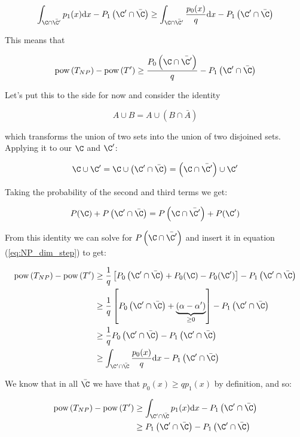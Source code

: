 	\[
	\int_{\C\cap\bar{\C^\prime}} p_1(x)\dd x - P_1\left(\C^\prime\cap\bar{\C}\right) \geq \int_{\C\cap\bar{\C^\prime}} \frac{p_0(x)}{q}\dd x - P_1\left(\C^\prime\cap\bar{\C}\right)
	\]

This means that 

	\begin{equation}
	\text{pow}\left(T_{NP}\right) - \text{pow}\left(T^\prime\right) \geq \frac{P_0\left(\C\cap\bar{\C^\prime}\right)}{q} - P_1\left(\C^\prime\cap\bar{\C}\right)
	\label{eq:NP_dim_step}
	\end{equation}
	
Let's put this to the side for now and consider the identity

	\[
	A \cup B = A \cup \left(B \cap \bar{A} \right)
	\]

which transforms the union of two sets into the union of two disjoined sets. Applying it to our $\C$ and $\C^\prime$:

	\[
	\C \cup \C^\prime = \C \cup \left(\C^\prime \cap \bar{\C}\right) = \left(\C \cap \bar{\C^\prime}\right) \cup \C^\prime
	\]
	
Taking the probability of the second and third terms we get:

	\[
	P(\C) + P\left(\C^\prime \cap \bar{\C}\right) = P\left(\C \cap \bar{\C^\prime}\right) + P(\C^\prime)
	\]
	
From this identity we can solve for $P\left(\C \cap \bar{\C^\prime}\right)$ and insert it in equation (\ref{eq:NP_dim_step}) to get:

\begin{align*}
	\text{pow}\left(T_{NP}\right) - \text{pow}\left(T^\prime\right) &\geq \frac{1}{q}\left[P_0\left(\C^\prime \cap \bar{\C}\right) + P_0(\C) -P_0(\C^\prime)\right] - P_1\left(\C^\prime\cap\bar{\C}\right)\\
	&\geq \frac{1}{q}\left[P_0\left(\C^\prime \cap \bar{\C}\right) + \underbrace{\left(\alpha-\alpha^\prime\right)}_{\geq 0}\right] - P_1\left(\C^\prime\cap\bar{\C}\right)\\
	&\geq \frac{1}{q} P_0\left(\C^\prime \cap \bar{\C}\right)- P_1\left(\C^\prime\cap\bar{\C}\right)\\
	&\geq \int_{\C^\prime\cap\bar{\C}} \frac{p_0(x)}{q}\dd x - P_1\left(\C^\prime\cap\bar{\C}\right)
\end{align*}

We know that in all $\bar{\C}$ we have that  $p_0(x) \geq qp_1(x)$ by definition, and so:

\begin{align*}
	\text{pow}\left(T_{NP}\right) - \text{pow}\left(T^\prime\right) &\geq \int_{\C^\prime\cap\bar{\C}} p_1(x) \dd x - P_1\left(\C^\prime\cap\bar{\C}\right)\\
	&\geq P_1\left(\C^\prime\cap\bar{\C}\right) - P_1\left(\C^\prime\cap\bar{\C}\right)\\
\end{align*}

